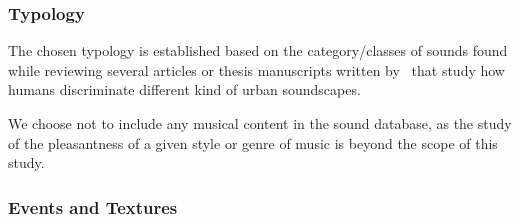 \documentclass[12pt]{elsarticle}
\newcommand{\etc}{\emph{etc.}}
\begin{document}
\subsubsection*{Typology}


The chosen typology is established based on the category/classes of sounds found while reviewing several articles or thesis manuscripts written by~\cite{maffiolo_caracterisation_1999,raimbault2002simulation,guastavino_etude_2003,defreville2004aactivity,raimbault2005urban,dubois2006cognitive,devergie_relations_2006,guastavino2006ideal,niessen2010categories,maffiolo_caracterisation_1999,beaumont2004pertinence,polack2008perceptive,leobon_analyse_1986,brown2011towards} that study how humans discriminate different kind of urban soundscapes.


We choose not to include any musical content in the sound database, as the study of the pleasantness of a given style or genre of music is beyond the scope of this study.

\subsubsection*{Events and Textures}

\end{document}
